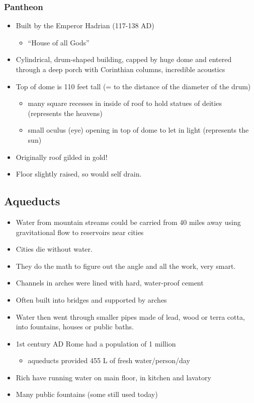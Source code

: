 \documentclass[12pt, twoside]{article}
\begin{document}
\subsubsection{Pantheon}
\begin{itemize}
\item Built by the Emperor Hadrian (117-138 AD)
	\begin{itemize}
	\item “House of all Gods”
	\end{itemize}
\item Cylindrical, drum-shaped building, capped by huge dome and entered through a deep porch with Corinthian columns, incredible acoustics
\item Top of dome is 110 feet tall (= to the distance of the diameter of the drum)
	\begin{itemize}
	\item many square recesses in inside of roof to hold statues of deities (represents the heavens)
	\item small oculus (eye) opening in top of dome to let in light (represents the sun)
	\end{itemize}
\item Originally roof gilded in gold!
\item Floor slightly raised, so would self drain.
\end{itemize}

\subsection{Aqueducts}
\begin{itemize}
\item Water from mountain streams could be carried from 40 miles away using gravitational flow to reservoirs near cities
\item Cities die without water.
\item They do the math to figure out the angle and all the work, very smart.
\item Channels in arches were lined with hard, water-proof cement
\item Often built into bridges and supported by arches
\item Water then went through smaller pipes made of lead, wood or terra cotta, into fountains, houses or public baths.
\item 1st century AD Rome had a population of 1 million
	\begin{itemize}
	\item aqueducts provided 455 L of fresh water/person/day
	\end{itemize}
\item Rich have running water on main floor, in kitchen and lavatory
\item Many public fountains (some still used today)
\end{itemize}
\end{document}
